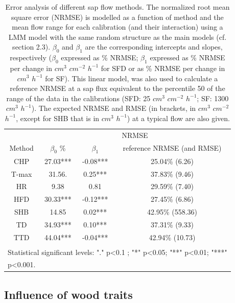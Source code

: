 \documentclass[11pt,twoside]{reedthesis}
\begin{document}
\par
\begin{table}[!h]

\caption[Error analysis of different sap flow methods.]{\label{tab:Ch2T2}Error analysis of different sap flow methods. The normalized root mean square error (NRMSE) is modelled as a function of method and the mean flow range for each calibration (and their interaction) using a LMM model with the same random structure as the main models (cf. section 2.3). $\beta_0$ and $\beta_1$ are the corresponding intercepts and slopes, respectively ($\beta_0$ expressed as \% NRMSE; $\beta_1$ expressed as \% NRMSE per change in $cm^3$ $cm^{-2}$ $h^{-1}$ for SFD or as \% NRMSE per change in $cm^3$ $h^{-1}$ for SF). This linear model, was also used to calculate a reference NRMSE at a sap flux equivalent to the percentile 50 of the range of the data in the calibrations (SFD: 25 $cm^3$ $cm^{-2}$ $h^{-1}$; SF: 1300 $cm^3$ $h^{-1}$). The expected NRMSE and RMSE (in brackets, in $cm^3$ $cm^{-2}$ $h^{-1}$, except for SHB that is in $cm^3$ $h^{-1}$) at a typical flow are also given.}
\centering
\fontsize{10}{12}\selectfont
\begin{tabular}[t]{cccc}
\toprule
\multicolumn{1}{c}{ } & \multicolumn{3}{c}{NRMSE} \\
\cmidrule(l{3pt}r{3pt}){2-4}
Method & $\beta_0$\; \% & $\beta_1$ & reference NRMSE (and RMSE)\\
\midrule
CHP & 27.03*** & -0.08*** & 25.04\% (6.26)\\
T-max & 31.56. & 0.25*** & 37.83\% (9.46)\\
HR & 9.38 & 0.81 & 29.59\% (7.40)\\
HFD & 30.33*** & -0.12*** & 27.45\% (6.86)\\
SHB & 14.85 & 0.02*** & 42.95\% (558.36)\\
TD & 34.93*** & 0.10*** & 37.31\% (9.33)\\
TTD & 44.04*** & -0.04*** & 42.94\% (10.73)\\
\bottomrule
\multicolumn{4}{l}{\textsuperscript{} Statistical significant levels: "." p<0.1 ; "*" p<0.05; "**" p<0.01; "***"}\\
\multicolumn{4}{l}{p<0.001.}\\
\end{tabular}
\end{table}
\subsection{Influence of wood traits}\label{influence-of-wood-traits}
\end{document}

